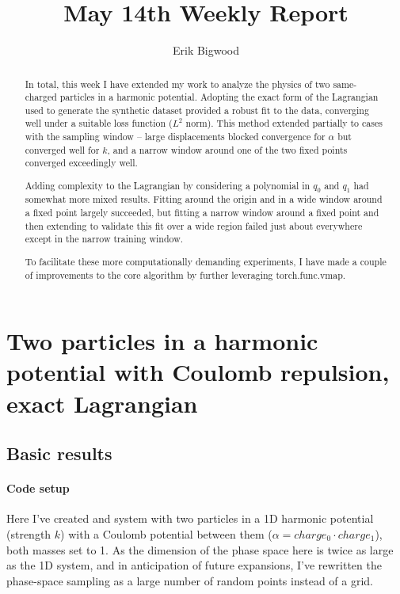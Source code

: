 \documentclass[]{article}
\title{May 14th Weekly Report}
\author{Erik Bigwood}
\begin{document}
\maketitle

\begin{abstract}
In total, this week I have extended my work to analyze the physics of two same-charged particles in a harmonic potential. Adopting the exact form of the Lagrangian used to generate the synthetic dataset provided a robust fit to the data, converging well under a suitable loss function ($L^2$ norm). This method extended partially to cases with the sampling window -- large displacements blocked convergence for $\alpha$ but converged well for $k$, and a narrow window around one of the two fixed points converged exceedingly well.

Adding complexity to the Lagrangian by considering a polynomial in $q_0$ and $q_1$ had somewhat more mixed results. Fitting around the origin and in a wide window around a fixed point largely succeeded, but fitting a narrow window around a fixed point and then extending to validate this fit over a wide region failed  just about everywhere except in the narrow training window.

To facilitate these more computationally demanding experiments, I have made a couple of improvements to the core algorithm by further leveraging torch.func.vmap.
\end{abstract}

\tableofcontents
\newpage

\section{Two particles in a harmonic potential with Coulomb repulsion, exact Lagrangian}
\subsection{Basic results}

\paragraph{Code setup}
Here I've created and system with two particles in a 1D harmonic potential (strength $k$) \cite{Taylor2005} with a Coulomb potential \cite{Griffiths2013} between them ($\alpha=charge_0\cdot charge_1$), both masses set to 1. As the dimension of the phase space here is twice as large as the 1D system, and in anticipation of future expansions, I've rewritten the phase-space sampling as a large number of random points instead of a grid.
\end{document}
